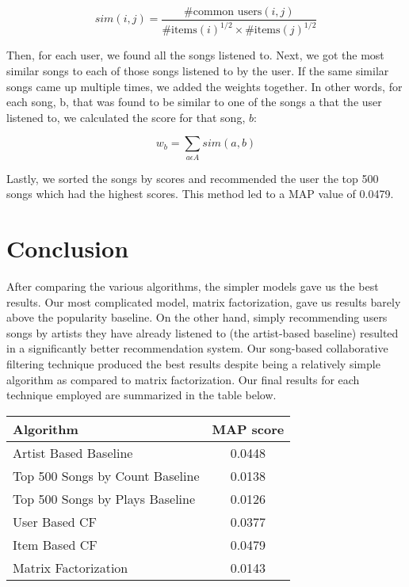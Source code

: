\documentclass[12pt,preprint]{aastex}
\begin{document}
\begin{equation}
sim(i,j) = \frac{\text{\# common users}(i, j)}{{\text{\# items}(i)}^{1/2} \times {\text{\# items}(j)}^{1/2}}
\end{equation}

Then, for each user, we found all the songs listened to. Next, we got the most similar songs to each of those songs listened to by the user. If the same similar songs came up multiple times, we added the weights together. In other words, for each song, b, that was found to be similar to one of the songs a that the user listened to, we calculated the score for that song, $b$:

$$w_b = \sum_{a \epsilon A} sim(a, b)$$

Lastly, we sorted the songs by scores and recommended the user the top 500 songs which had the highest scores. This method led to a MAP value of 0.0479.





\section{Conclusion}
After comparing the various algorithms, the simpler models gave us the best results. Our most complicated model, matrix factorization, gave us results barely above the popularity baseline. On the other hand, simply recommending users songs by artists they have already listened to (the artist-based baseline) resulted in a significantly better recommendation system. Our song-based collaborative filtering technique produced the best results despite being a relatively simple algorithm as compared to matrix factorization. Our final results for each technique employed are summarized in the table below. 

\begin{table}[h]
\begin{center}
\begin{tabular}{lc}

\hline
\bf{Algorithm} &  \bf{MAP score}\\ \hline
Artist Based  Baseline  & 0.0448    \\ 
Top 500 Songs by Count  Baseline &  0.0138  \\ 
Top 500 Songs by Plays  Baseline &  0.0126  \\ 
User Based  CF  &  0.0377 \\ 
Item Based  CF  &  0.0479 \\ 
Matrix Factorization  &   0.0143  \\ 
\end{tabular}
\end{center}
\end{table}
\end{document}
